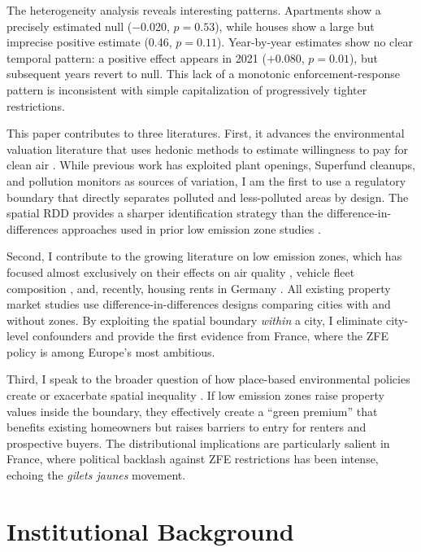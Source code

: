 \documentclass[12pt]{article}
\begin{document}
The heterogeneity analysis reveals interesting patterns. Apartments show a precisely estimated null ($-$0.020, $p = 0.53$), while houses show a large but imprecise positive estimate (0.46, $p = 0.11$). Year-by-year estimates show no clear temporal pattern: a positive effect appears in 2021 ($+$0.080, $p = 0.01$), but subsequent years revert to null. This lack of a monotonic enforcement-response pattern is inconsistent with simple capitalization of progressively tighter restrictions.

This paper contributes to three literatures. First, it advances the environmental valuation literature that uses hedonic methods to estimate willingness to pay for clean air \citep{chay2005does, currie2015environmental}. While previous work has exploited plant openings, Superfund cleanups, and pollution monitors as sources of variation, I am the first to use a regulatory boundary that directly separates polluted and less-polluted areas by design. The spatial RDD provides a sharper identification strategy than the difference-in-differences approaches used in prior low emission zone studies \citep{wolff2023low, aydin2023berlin}.

Second, I contribute to the growing literature on low emission zones, which has focused almost exclusively on their effects on air quality \citep{gehrsitz2017effect}, vehicle fleet composition \citep{wolff2014air}, and, recently, housing rents in Germany \citep{wolff2023low}. All existing property market studies use difference-in-differences designs comparing cities with and without zones. By exploiting the spatial boundary \textit{within} a city, I eliminate city-level confounders and provide the first evidence from France, where the ZFE policy is among Europe's most ambitious.

Third, I speak to the broader question of how place-based environmental policies create or exacerbate spatial inequality \citep{tiebout1956pure, banzhaf2008people}. If low emission zones raise property values inside the boundary, they effectively create a ``green premium'' that benefits existing homeowners but raises barriers to entry for renters and prospective buyers. The distributional implications are particularly salient in France, where political backlash against ZFE restrictions has been intense, echoing the \textit{gilets jaunes} movement.

\section{Institutional Background}
\end{document}
